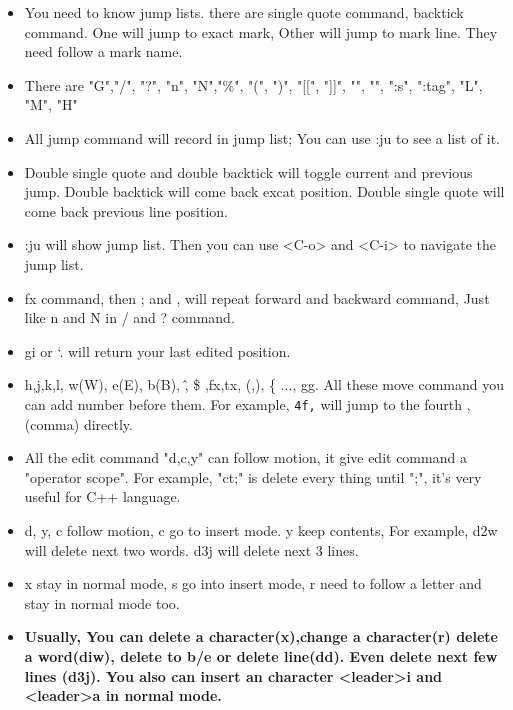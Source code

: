 \documentclass[a4paper,12pt,twoside]{book}
\begin{document}
\begin{itemize}
\begin{center}
\begin{itemize}
		\item You need to know jump lists. there are single quote command, backtick command. One will jump to exact mark, Other will jump to mark line. They need follow a mark name.
		\item There are "G","/", "?", "n", "N","\%", "(", ")", "[[", "]]", "{", "}", ":s", ":tag", "L", "M", "H"
		\item All jump command will record in jump list; You can use :ju to see a list of it.
		\item Double single quote and double backtick will toggle current and previous jump. Double backtick will come back excat position. Double single quote will come back previous line position.
		\item :ju will show jump list. Then you can use <C-o> and <C-i> to navigate the jump list. 
		\item fx command, then ; and , will repeat forward and backward command, Just like n and N in / and ? command.
		\item gi or `. will return your last edited position. 
\end{itemize}


\begin{itemize}

		\item h,j,k,l, w(W), e(E), b(B), \^ , \$ ,fx,tx, (,), \{ ..., gg. All these move command you can add number before them. For example, \verb=4f,= will jump to the fourth ,(comma) directly.    
		

				\item All the edit command "d,c,y" can follow motion, it give edit command a "operator scope". For example, "ct;" is delete every thing until ";", it's very useful for C++ language. 

				\item d, y, c follow motion, c go to insert mode. y keep contents, For example, d2w will delete next two words. d3j will delete next 3 lines.

				\item x stay in normal mode, s go into insert mode, r need to follow a letter and stay in normal mode too.
				
				\item \textbf{Usually, You can delete a character(x),change a character(r) delete a word(diw), delete to b/e or delete line(dd). Even delete next few lines (d3j). You also can insert an character <leader>i and <leader>a in normal mode. }  
				

\end{itemize}
\end{center}
\end{itemize}
\end{document}

